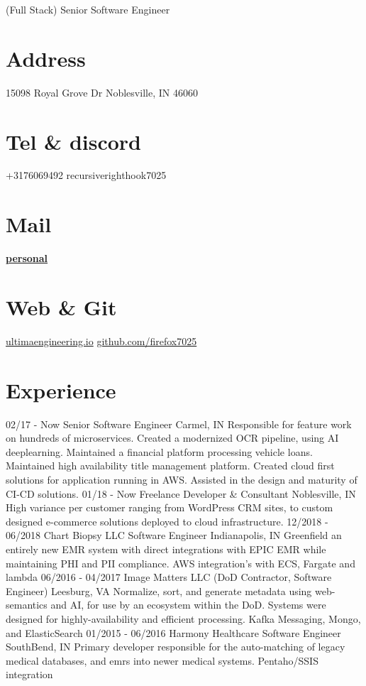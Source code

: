 \documentclass[]{friggeri-cv}
\begin{document}
      {(Full Stack) Senior Software Engineer}
      

\begin{aside}
  \section{Address}
    15098 Royal Grove Dr
    Noblesville, IN 46060
    ~
  \section{Tel \& discord}
    +3176069492
    recursiverighthook7025
    ~
  \section{Mail}
    \href{mailto:alexandermontgomery95@gmail.com}{\textbf{personal}}
    ~
  \section{Web \& Git}
    \href{http://www.ultimaengineering.io}{ultimaengineering.io}
    \href{https://github.com/firefox7025}{github.com/firefox7025}
\end{aside}

\section{Experience}
\begin{entrylist}
  \entry
    {02/17 - Now}
    {Senior Software Engineer}
    {Carmel, IN}
    {Responsible for feature work on hundreds of microservices. Created a modernized OCR pipeline, using AI deeplearning. Maintained a financial platform processing vehicle loans. Maintained high availability title management platform. Created cloud first solutions for application running in AWS. Assisted in the design and maturity of CI-CD solutions.  }
  \entry
    {01/18 - Now}
    {Freelance Developer \& Consultant}
    {Noblesville, IN}
    {High variance per customer ranging from WordPress CRM sites, to custom designed e-commerce solutions deployed to cloud infrastructure. }
    \entry
    {12/2018 - 06/2018}
    {Chart Biopsy LLC Software Engineer}
    {Indianapolis, IN}
    {Greenfield an entirely new EMR system with direct integrations with EPIC EMR while maintaining PHI and PII compliance. AWS integration's with ECS, Fargate and lambda }
    \entry
    {06/2016 - 04/2017}
    {Image Matters LLC (DoD Contractor, Software Engineer)}
    {Leesburg, VA}
    {Normalize, sort, and generate metadata using web-semantics and AI, for use by an ecosystem within the DoD. Systems were designed for highly-availability and efficient processing. Kafka Messaging, Mongo, and ElasticSearch }
    \entry
    {01/2015 - 06/2016}
    {Harmony Healthcare Software Engineer}
    {SouthBend, IN}
    {Primary developer responsible for the auto-matching of legacy medical databases, and emrs into newer medical systems. Pentaho/SSIS integration}
\end{entrylist}
\end{document}
